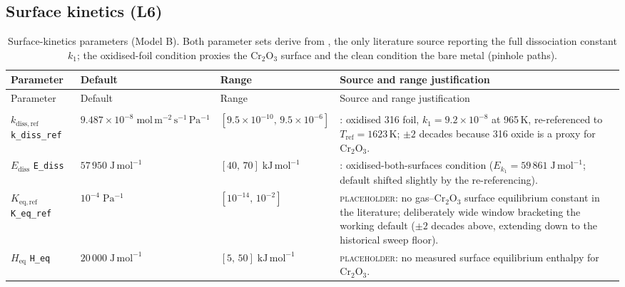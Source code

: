 \documentclass[11pt,a4paper]{article}
\newcommand{\Keq}{K_{\mathrm{eq}}}
\newcommand{\kdiss}{k_{\mathrm{diss}}}
\newcommand{\code}[1]{\texttt{#1}}
\begin{document}
\subsection{Surface kinetics (L6)}

{\footnotesize
\setlength{\tabcolsep}{4pt}
\begin{longtable}{@{}l l l >{\raggedright\arraybackslash}p{4.1cm}@{}}
\caption{Surface-kinetics parameters (Model B). Both parameter sets derive
from \citet{grant1988}, the only literature source reporting the full
dissociation constant $k_1$; the oxidised-foil condition proxies the
$\mathrm{Cr_2O_3}$ surface and the clean condition the bare metal (pinhole
paths).}
\label{tab:paramsC}\\
\toprule
Parameter & Default & Range & Source and range justification \\
\midrule
\endfirsthead
\toprule
Parameter & Default & Range & Source and range justification \\
\midrule
\endhead
\bottomrule
\endfoot
\multicolumn{4}{@{}l}{\emph{Oxide surface (gas--$\mathrm{Cr_2O_3}$) --- $\kdiss$, $\Keq$ in Eqs.~\eqref{eq:ads}--\eqref{eq:Jsurf}}}\\
$k_{\mathrm{diss,ref}}$ \code{k\_diss\_ref} & $9.487\times10^{-8}\;\mathrm{mol\,m^{-2}\,s^{-1}\,Pa^{-1}}$ & $[9.5\times10^{-10},\,9.5\times10^{-6}]$ & \citet{grant1988}: oxidised 316 foil, $k_1 = 9.2\times10^{-8}$ at 965\,K, re-referenced to $T_{\mathrm{ref}}=1623$\,K; $\pm2$ decades because 316 oxide is a proxy for $\mathrm{Cr_2O_3}$. \\
$E_{\mathrm{diss}}$ \code{E\_diss} & $57\,950\;\mathrm{J\,mol^{-1}}$ & $[40,\,70]\;\mathrm{kJ\,mol^{-1}}$ & \citet{grant1988}: oxidised-both-surfaces condition ($E_{k_1} = 59\,861\;\mathrm{J\,mol^{-1}}$; default shifted slightly by the re-referencing). \\
$K_{\mathrm{eq,ref}}$ \code{K\_eq\_ref} & $10^{-4}\;\mathrm{Pa^{-1}}$ & $[10^{-14},\,10^{-2}]$ & \textsc{placeholder}: no gas--$\mathrm{Cr_2O_3}$ surface equilibrium constant in the literature; deliberately wide window bracketing the working default ($\pm2$ decades above, extending down to the historical sweep floor). \\
$H_{\mathrm{eq}}$ \code{H\_eq} & $20\,000\;\mathrm{J\,mol^{-1}}$ & $[5,\,50]\;\mathrm{kJ\,mol^{-1}}$ & \textsc{placeholder}: no measured surface equilibrium enthalpy for $\mathrm{Cr_2O_3}$. \\

\end{longtable}}
\end{document}
